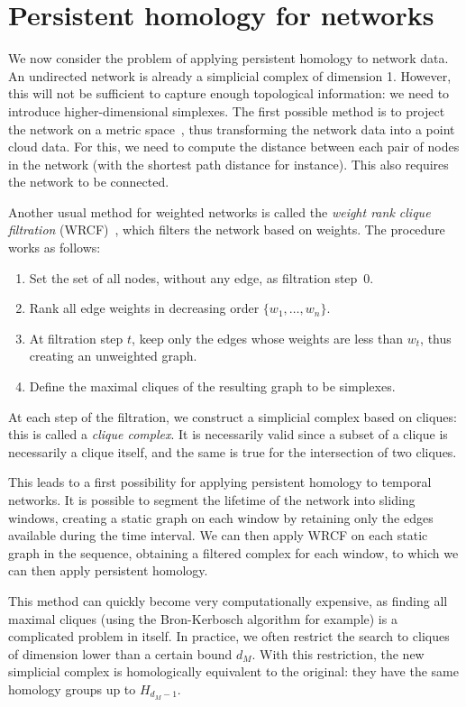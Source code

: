 \documentclass[a4paper,11pt,openany,extrafontsizes]{memoir}
\begin{document}
\section{Persistent homology for networks}%
\label{sec:pers-homol-netw}

We now consider the problem of applying persistent homology to network
data. An undirected network is already a simplicial complex of
dimension 1. However, this will not be sufficient to capture enough
topological information: we need to introduce higher-dimensional
simplexes. The first possible method is to project the network on a
metric space~\cite{otter_roadmap_2017}, thus transforming the network
data into a point cloud data. For this, we need to compute the
distance between each pair of nodes in the network (with the shortest
path distance for instance). This also requires the network to be
connected.

Another usual method for weighted networks is called the \emph{weight
  rank clique filtration} (WRCF)~\cite{petri_topological_2013}, which
filters the network based on weights. The procedure works as follows:
\begin{enumerate}
\item Set the set of all nodes, without any edge, as filtration
  step~0.
\item Rank all edge weights in decreasing order $\{w_1,\ldots,w_n\}$.
\item At filtration step $t$, keep only the edges whose weights are
  less than $w_t$, thus creating an unweighted graph.
\item Define the maximal cliques of the resulting graph to be
  simplexes.
\end{enumerate}

At each step of the filtration, we construct a simplicial complex
based on cliques: this is called a \emph{clique complex}. It is
necessarily valid since a subset of a clique is necessarily a clique
itself, and the same is true for the intersection of two cliques.

This leads to a first possibility for applying persistent homology to
temporal networks. It is possible to segment the lifetime of the
network into sliding windows, creating a static graph on each window
by retaining only the edges available during the time interval. We can
then apply WRCF on each static graph in the sequence, obtaining a
filtered complex for each window, to which we can then apply
persistent homology.

This method can quickly become very computationally expensive, as
finding all maximal cliques (using the Bron-Kerbosch algorithm for
example) is a complicated problem in itself. In practice, we often
restrict the search to cliques of dimension lower than a certain bound
$d_M$. With this restriction, the new simplicial complex is
homologically equivalent to the original: they have the same homology
groups up to $H_{d_M-1}$.
\end{document}
